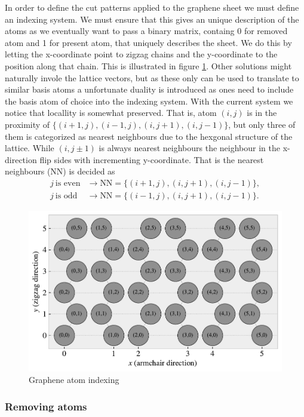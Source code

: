 In order to define the cut patterns applied to the graphene sheet we must define an indexing system. We must ensure that this gives an
unique description of the atoms as we eventually want to pass a binary matrix, containg 0 for removed atom and 1 for present atom, that
uniquely describes the sheet. We do this by letting the x-coordinate point to zigzag chains and the y-coordinate to the position along that
chain. This is illustrated in figure \ref{fig:atom_indexing}. Other solutions might naturally invole the lattice vectors, but as these only
can be used to translate to similar basis atoms a unfortunate duality is introduced as ones need to include the basis atom of choice into
the indexing system. With the current system we notice that locallity is somewhat preserved. That is, atom $(i, j)$ is in the proximity of
$\{(i+1, j), (i-1, j), (i, j+1), (i, j-1)\}$, but only three of them is categorized as nearest neighbours due to the hexgonal structure of
the lattice. While $(i, j\pm 1)$ is always nearest neighbours the neighbour in the x-direction flip sides with incrementing y-coordinate.
That is the nearest neighbours (NN) is decided as
\begin{align*}
  j \ \text{is even} &\rightarrow \text{NN} = \{(i+1, j), (i, j+1), (i, j-1)\}, \\
  j \ \text{is odd} &\rightarrow \text{NN} = \{(i-1, j), (i, j+1), (i, j-1)\}.
\end{align*}

\begin{figure}[H]
  \centering
  \includegraphics[width=0.7\linewidth]{figures/atom_indexing.pdf}
  \caption{Graphene atom indexing}
  \label{fig:atom_indexing}
\end{figure}

\subsubsection{Removing atoms}

